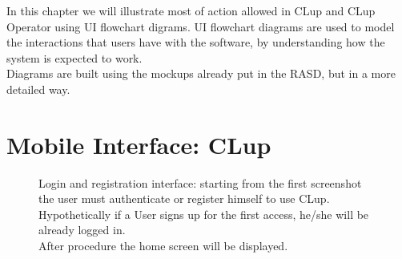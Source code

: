 In this chapter we will illustrate most of action allowed in CLup and CLup Operator using UI flowchart digrams. UI flowchart diagrams are used to model the interactions that users have with the software, by understanding how the system is expected to work. \\
Diagrams are built using the mockups already put in the RASD, but in a more detailed way.

\section{Mobile Interface: CLup}

\begin{figure}[H]
  \label{login_rec}
  \centering
    \caption{Login and registration interface: starting from the first screenshot the user must authenticate or register himself to use CLup. Hypothetically if a User signs up for the first access, he/she will be already logged in. \\
    After procedure the home screen will be displayed.}
\end{figure}



